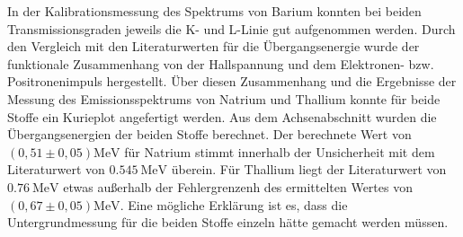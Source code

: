 In der Kalibrationsmessung des Spektrums von Barium konnten bei beiden Transmissionsgraden jeweils die K- und L-Linie gut aufgenommen werden. Durch den Vergleich mit den Literaturwerten für die Übergangsenergie wurde der funktionale Zusammenhang von der Hallspannung und dem Elektronen- bzw. Positronenimpuls hergestellt. Über diesen Zusammenhang und die Ergebnisse der Messung des Emissionsspektrums von Natrium und Thallium konnte für beide Stoffe ein Kurieplot angefertigt werden. Aus dem Achsenabschnitt wurden die Übergangsenergien der beiden Stoffe berechnet. Der berechnete Wert von $\si{(0,51 \pm 0,05)\mega\eV}$ für Natrium stimmt innerhalb der Unsicherheit mit dem Literaturwert von $\SI{0,545}{\mega\eV}$\cite{naenergy} überein. Für Thallium liegt der Literaturwert von $\SI{0,76}{\mega\eV}$\cite{tlenergy} etwas außerhalb der Fehlergrenzenh des ermittelten Wertes von $\si{(0,67 \pm 0,05)\mega\eV}$. Eine mögliche Erklärung ist es, dass die Untergrundmessung für die beiden Stoffe einzeln hätte gemacht werden müssen. 

